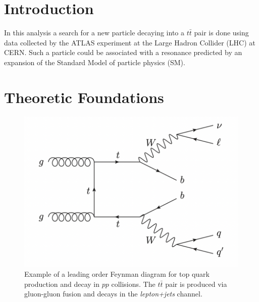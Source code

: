 \section{Introduction}
In this analysis a search for a new particle decaying into a $t\bar{t}$ pair is done using data collected by the ATLAS experiment at the Large Hadron Collider (LHC) at CERN. Such a particle could be associated with a resonance predicted by an expansion of the Standard Model of particle physics (SM).

\section{Theoretic Foundations}

\begin{figure}[tb]
  \centering
  \includegraphics[width=.8\textwidth]{graphics/top_decay.png}
  \caption{Example of a leading order Feynman diagram for top quark production and decay in $pp$ collisions. The $t\bar{t}$ pair is produced via gluon-gluon fusion and decays in the \textit{lepton+jets} channel.~\cite{anleitung}}
  \label{fig:decay}
\end{figure}

